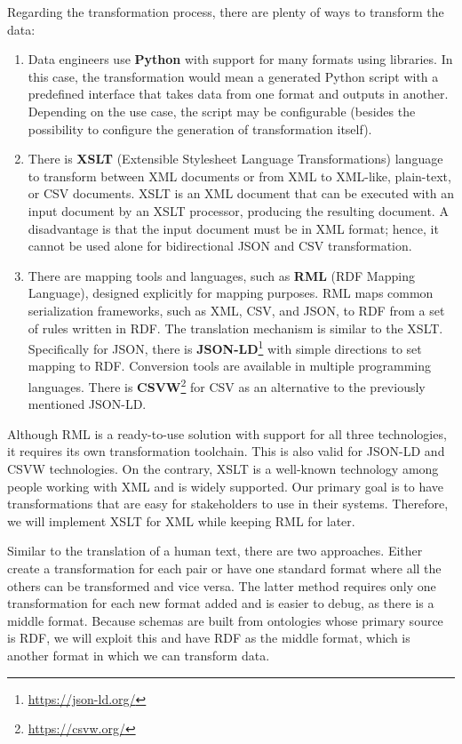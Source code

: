 Regarding the transformation process, there are plenty of ways to transform the data:
\begin{enumerate}
    \item Data engineers use \textbf{Python} with support for many formats using libraries. In this case, the transformation would mean a generated Python script with a predefined interface that takes data from one format and outputs in another. Depending on the use case, the script may be configurable (besides the possibility to configure the generation of transformation itself).
    \item There is \textbf{XSLT} (Extensible Stylesheet Language Transformations) language to transform between XML documents or from XML to XML-like, plain-text, or CSV documents. XSLT is an XML document that can be executed with an input document by an XSLT processor, producing the resulting document. A disadvantage is that the input document must be in XML format; hence, it cannot be used alone for bidirectional JSON and CSV transformation.
    \item There are mapping tools and languages, such as \textbf{RML} \cite{dimou2014rml} (RDF Mapping Language), designed explicitly for mapping purposes. RML maps common serialization frameworks, such as XML, CSV, and JSON, to RDF from a set of rules written in RDF. The translation mechanism is similar to the XSLT. Specifically for JSON, there is \textbf{JSON-LD}\footnote{\url{https://json-ld.org/}} with simple directions to set mapping to RDF. Conversion tools are available in multiple programming languages. There is \textbf{CSVW}\footnote{\url{https://csvw.org/}} for CSV as an alternative to the previously mentioned JSON-LD.
\end{enumerate}

Although RML is a ready-to-use solution with support for all three technologies, it requires its own transformation toolchain. This is also valid for JSON-LD and CSVW technologies. On the contrary, XSLT is a well-known technology among people working with XML and is widely supported. Our primary goal is to have transformations that are easy for stakeholders to use in their systems. Therefore, we will implement XSLT for XML while keeping RML for later.

Similar to the translation of a human text, there are two approaches. Either create a transformation for each pair or have one standard format where all the others can be transformed and vice versa. The latter method requires only one transformation for each new format added and is easier to debug, as there is a middle format. Because schemas are built from ontologies whose primary source is RDF, we will exploit this and have RDF as the middle format, which is another format in which we can transform data.

